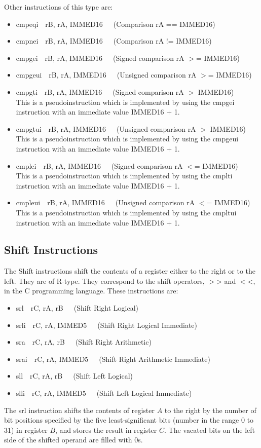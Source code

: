\documentclass[11pt, twoside, pdftex]{article}
\begin{document}
\noindent
Other instructions of this type are:
\begin{itemize}
\item {\sf cmpeqi~~rB, rA, IMMED16}~~~(Comparison rA == IMMED16)
\item {\sf cmpnei~~rB, rA, IMMED16}~~~(Comparison rA != IMMED16)
\item {\sf cmpgei~~rB, rA, IMMED16}~~~(Signed comparison rA $>$= IMMED16)
\item {\sf cmpgeui~~rB, rA, IMMED16}~~~(Unsigned comparison rA $>$= IMMED16)
\item {\sf cmpgti~~rB, rA, IMMED16}~~~(Signed comparison rA $>$ IMMED16) \\
This is a pseudoinstruction which is implemented by using the {\sf cmpgei} instruction 
with an immediate value IMMED16 + 1.
\item {\sf cmpgtui~~rB, rA, IMMED16}~~~(Unsigned comparison rA $>$ IMMED16) \\
This is a pseudoinstruction which is implemented by using the {\sf cmpgeui} instruction 
with an immediate value IMMED16 + 1.
\item {\sf cmplei~~rB, rA, IMMED16}~~~(Signed comparison rA $<$= IMMED16) \\
This is a pseudoinstruction which is implemented by using the {\sf cmplti} instruction with
an immediate value IMMED16 + 1.
\item {\sf cmpleui~~rB, rA, IMMED16}~~~(Unsigned comparison rA $<$= IMMED16) \\
This is a pseudoinstruction which is implemented by using the {\sf cmpltui} instruction with
an immediate value IMMED16 + 1.
\end{itemize}

\subsection{Shift Instructions}

The Shift instructions shift the contents of a register either to the right or to the left.
They are of R-type. They correspond to the shift operators, $>$> and $<$<, in the C programming
language. These instructions are:
\begin{itemize}
\item {\sf srl~~rC, rA, rB}~~~(Shift Right Logical)
\item {\sf srli~~rC, rA, IMMED5}~~~(Shift Right Logical Immediate)
\item {\sf sra~~rC, rA, rB}~~~(Shift Right Arithmetic)
\item {\sf srai~~rC, rA, IMMED5}~~~(Shift Right Arithmetic Immediate)
\item {\sf sll~~rC, rA, rB}~~~(Shift Left Logical)
\item {\sf slli~~rC, rA, IMMED5}~~~(Shift Left Logical Immediate)
\end{itemize}
\noindent
The {\sf srl} instruction shifts the contents of register $A$ to the right by the number 
of bit positions specified by the five least-significant bits (number in the range 0 to 31)
in register $B$, and stores the result in register $C$. The vacated bits on the left side
of the shifted operand are filled with 0s.
 
\end{document}
